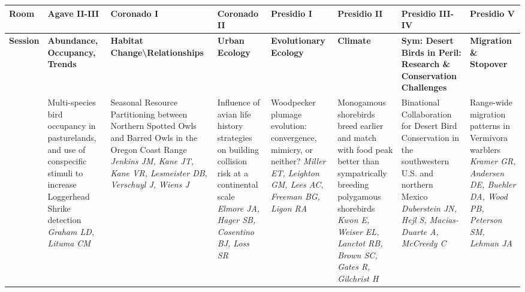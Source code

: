 \begin{tabular}{|x{0.85cm}|x{2.85cm}|x{2.85cm}|x{2.85cm}|x{2.85cm}|x{2.85cm}|a{2.85cm}|x{2.85cm}|}\hline
Room & Agave II-III & Coronado I & Coronado II & Presidio I & Presidio II & Presidio III-IV & Presidio V\\
\hline
\rule{0pt}{1em} \textbf{Session} &\footnotesize \textbf{Abundance, Occupancy, Trends} & \footnotesize \textbf{Habitat Change\textbackslash Relationships} & \footnotesize \textbf{Urban Ecology} & \footnotesize \textbf{Evolutionary Ecology} & \footnotesize \textbf{Climate} & \footnotesize \textbf{Sym: Desert Birds in Peril: Research \& Conservation Challenges} & \footnotesize \textbf{Migration \& Stopover}\\
\hline
{}&Multi-species bird occupancy in pasturelands, and use of conspecific stimuli to increase Loggerhead Shrike detection \newline \newline \textit{Graham LD, Lituma CM} & Seasonal Resource Partitioning between Northern Spotted Owls and Barred Owls in the Oregon Coast Range \newline \newline \textit{Jenkins JM, Kane JT, Kane VR, Lesmeister DB, Verschuyl J, Wiens J} & Influence of avian life history strategies on building collision risk at a continental scale \newline \newline \textit{Elmore JA, Hager SB, Cosentino BJ, Loss SR} & Woodpecker plumage evolution: convergence, mimicry, or neither? \newline \newline \textit{Miller ET, Leighton GM, Lees AC, Freeman BG, Ligon RA} & Monogamous shorebirds breed earlier and match with food peak better than sympatrically breeding polygamous shorebirds \newline \newline \textit{Kwon E, Weiser EL, Lanctot RB, Brown SC, Gates R, Gilchrist H} & Binational Collaboration for Desert Bird Conservation in the southwestern U.S. and northern Mexico \newline \newline \textit{Duberstein JN, Hejl S, Macias-Duarte A, McCreedy C} & Range-wide migration patterns in Vermivora warblers \newline \newline \textit{Kramer GR, Andersen DE, Buehler DA, Wood PB, Peterson SM, Lehman JA}\\
\hline

\end{tabular}
